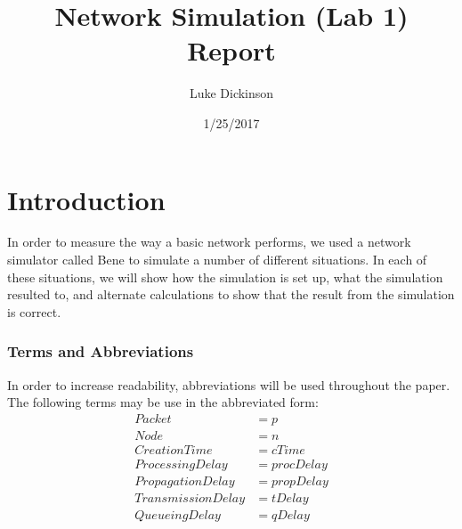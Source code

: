 \documentclass[fleqn,11pt]{article}
\begin{document}
\lstset{
  language=Python,
  basicstyle=\small,          %
  keywordstyle=\bfseries,
  identifierstyle=,           %
  commentstyle=,              %
  stringstyle=\ttfamily,      %
  showstringspaces=false,     %
  numbers=left,
  numberstyle=\tiny,
  numbersep=5pt,
  frame=tb,
}

\title{Network Simulation (Lab 1) Report}

\author{Luke Dickinson}

\date{1/25/2017}

\maketitle

\section{Introduction}

In order to measure the way a basic network performs, we used a network simulator called Bene to simulate a number of different situations. In each of these situations, we will show how the simulation is set up, what the simulation resulted to, and alternate calculations to show that the result from the simulation is correct.
\subsubsection{Terms and Abbreviations }

In order to increase readability, abbreviations will be used throughout the paper. The following terms may be use in the abbreviated form:
\begin{align*}
Packet &= p\\
Node &= n\\
CreationTime &= cTime\\
ProcessingDelay &= procDelay\\
PropagationDelay &= propDelay\\
TransmissionDelay &= tDelay\\
QueueingDelay &= qDelay\\
\end{align*}
\end{document}
